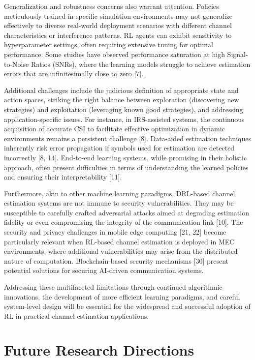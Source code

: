\documentclass[journal,twocolumn]{IEEEtran}
\begin{document}
Generalization and robustness concerns also warrant attention. Policies meticulously trained in specific simulation environments may not generalize effectively to diverse real-world deployment scenarios with different channel characteristics or interference patterns. RL agents can exhibit sensitivity to hyperparameter settings, often requiring extensive tuning for optimal performance. Some studies have observed performance saturation at high Signal-to-Noise Ratios (SNRs), where the learning models struggle to achieve estimation errors that are infinitesimally close to zero [7].

Additional challenges include the judicious definition of appropriate state and action spaces, striking the right balance between exploration (discovering new strategies) and exploitation (leveraging known good strategies), and addressing application-specific issues. For instance, in IRS-assisted systems, the continuous acquisition of accurate CSI to facilitate effective optimization in dynamic environments remains a persistent challenge [8]. Data-aided estimation techniques inherently risk error propagation if symbols used for estimation are detected incorrectly [8, 14]. End-to-end learning systems, while promising in their holistic approach, often present difficulties in terms of understanding the learned policies and ensuring their interpretability [11].

Furthermore, akin to other machine learning paradigms, DRL-based channel estimation systems are not immune to security vulnerabilities. They may be susceptible to carefully crafted adversarial attacks aimed at degrading estimation fidelity or even compromising the integrity of the communication link [10]. The security and privacy challenges in mobile edge computing [21, 22] become particularly relevant when RL-based channel estimation is deployed in MEC environments, where additional vulnerabilities may arise from the distributed nature of computation. Blockchain-based security mechanisms [30] present potential solutions for securing AI-driven communication systems.

Addressing these multifaceted limitations through continued algorithmic innovations, the development of more efficient learning paradigms, and careful system-level design will be essential for the widespread and successful adoption of RL in practical channel estimation applications.

\section{Future Research Directions}
\end{document}
